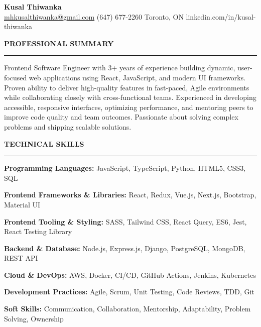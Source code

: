 \documentclass[10pt,letterpaper]{article}
\begin{document}
\begin{center}
{\LARGE\textbf{Kusal Thiwanka}}\\[3pt]
\href{mailto:mhkusalthiwanka@gmail.com}{mhkusalthiwanka@gmail.com}\hspace{2em}%
(647) 677{-}2260\hspace{2em}%
Toronto, ON\hspace{2em}
linkedin.com/in/kusal-thiwanka
\end{center}

\vspace{6pt}

\textbf{PROFESSIONAL SUMMARY}\\[-8pt]
\noindent\rule{\textwidth}{1pt}

\vspace{-2pt}

Frontend Software Engineer with 3+ years of experience building dynamic, user-focused web applications using React, JavaScript, and modern UI frameworks. Proven ability to deliver high-quality features in fast-paced, Agile environments while collaborating closely with cross-functional teams. Experienced in developing accessible, responsive interfaces, optimizing performance, and mentoring peers to improve code quality and team outcomes. Passionate about solving complex problems and shipping scalable solutions.

\vspace{8pt}

\textbf{TECHNICAL SKILLS}\\[-8pt]
\noindent\rule{\textwidth}{1pt}

\vspace{-2pt}

\textbf{Programming Languages:} JavaScript, TypeScript, Python, HTML5, CSS3, SQL

\textbf{Frontend Frameworks \& Libraries:} React, Redux, Vue.js, Next.js, Bootstrap, Material UI

\textbf{Frontend Tooling \& Styling:} SASS, Tailwind CSS, React Query, ES6, Jest, React Testing Library

\textbf{Backend \& Database:} Node.js, Express.js, Django, PostgreSQL, MongoDB, REST API

\textbf{Cloud \& DevOps:} AWS, Docker, CI/CD, GitHub Actions, Jenkins, Kubernetes

\textbf{Development Practices:} Agile, Scrum, Unit Testing, Code Reviews, TDD, Git

\textbf{Soft Skills:} Communication, Collaboration, Mentorship, Adaptability, Problem Solving, Ownership
\end{document}
